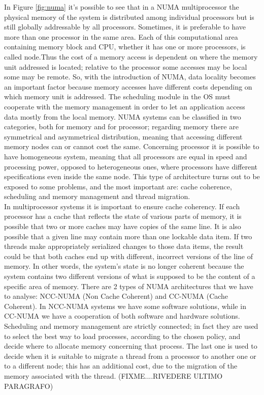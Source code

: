 \documentclass[a4paper,10pt]{article}
\begin{document}
\begin{multicols}{2}
In Figure \ref{fig:numa} it's possible to see that in a NUMA multiprocessor the physical memory of the system is distributed among individual processors but is still globally addressable by all processors. Sometimes, it is preferable to have more than one processor in the same area. Each of this computational area containing memory block and CPU, whether it has one or more processors, is called node.Thus the cost of a memory access is dependent on where the memory unit addressed is located; relative to the processor some accesses may be local some may be remote. So, with the introduction of NUMA, data locality becomes an important factor because memory accesses have different costs depending on which memory unit is addressed. The scheduling module in the OS must cooperate with the memory management in order to let an application access data mostly from the local memory. NUMA systems can be classified in two categories, both for memory and for processor; regarding memory there are symmetrical and asymmetrical distribution, meaning that accessing different memory nodes can or cannot cost the same. Concerning processor it is possible to have homogeneous system, meaning that all processors are equal in speed and processing power, opposed to heterogeneous ones, where processors have different specifications even inside the same node. This type of architecture turns out to be exposed to some problems, and the most important are: cache coherence, scheduling and memory management and thread migration.\\
In multiprocessor systems it is important to ensure cache coherency. If each processor has a cache that reflects the state of various parts of memory, it is possible that two or more caches may have copies of the same line. It is also possible that a given line may contain more than one lockable data item. If two threads make appropriately serialized changes to those data items, the result could be that both caches end up with different, incorrect versions of the line of memory. In other words, the system's state is no longer coherent because the system contains two different versions of what is supposed to be the content of a specific area of memory. There are 2 types of NUMA architectures that we have to analyse: NCC-NUMA (Non Cache Coherent) and CC-NUMA (Cache Coherent). In NCC-NUMA systems we have some software solutions, while in CC-NUMA we have a cooperation of both software and hardware solutions.\\
Scheduling and memory management are strictly connected; in fact they are used to select the best way to load processes, according to the chosen policy, and decide where to allocate memory concerning that process. The last one is used to decide when it is suitable to migrate a thread from a processor to another one or to a different node; this has an additional cost, due to the migration of the memory associated with the thread. (FIXME....RIVEDERE ULTIMO PARAGRAFO)



\end{multicols}
\end{document}
